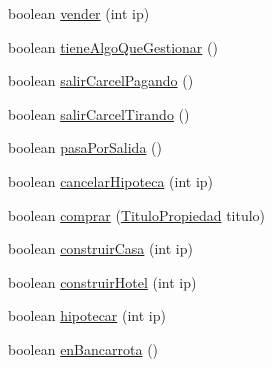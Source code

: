 \begin{DoxyCompactItemize}
\item 
boolean \hyperlink{classcivitas_1_1Jugador_aa9a90b759adaccfd58e322c5518bb0f9}{vender} (int ip)
\item 
boolean \hyperlink{classcivitas_1_1Jugador_a076d9059f63b0176becea3c15dc98493}{tiene\+Algo\+Que\+Gestionar} ()
\item 
boolean \hyperlink{classcivitas_1_1Jugador_ac084bcf2599582f25908cc4214cb6937}{salir\+Carcel\+Pagando} ()
\item 
boolean \hyperlink{classcivitas_1_1Jugador_a2c4106981ddfb43872df3303685739c1}{salir\+Carcel\+Tirando} ()
\item 
boolean \hyperlink{classcivitas_1_1Jugador_ac876d67da8365c7a97767a2930113c72}{pasa\+Por\+Salida} ()
\item 
boolean \hyperlink{classcivitas_1_1Jugador_a3258e1efe659b753aae45e38d6d7a6e2}{cancelar\+Hipoteca} (int ip)
\item 
boolean \hyperlink{classcivitas_1_1Jugador_a8f31f1a403355a68600c591ddf6d5418}{comprar} (\hyperlink{classcivitas_1_1TituloPropiedad}{Titulo\+Propiedad} titulo)
\item 
boolean \hyperlink{classcivitas_1_1Jugador_ab98bd17b404c3b4eeb28657012ff99ff}{construir\+Casa} (int ip)
\item 
boolean \hyperlink{classcivitas_1_1Jugador_ab842fbff55eb5609c8b2f3a6a211d4eb}{construir\+Hotel} (int ip)
\item 
boolean \hyperlink{classcivitas_1_1Jugador_aad3e438212a101326c99e79c3c314f4b}{hipotecar} (int ip)
\item 
boolean \hyperlink{classcivitas_1_1Jugador_a00dffd4d41a489e824816f7fece988fc}{en\+Bancarrota} ()
\end{DoxyCompactItemize}
